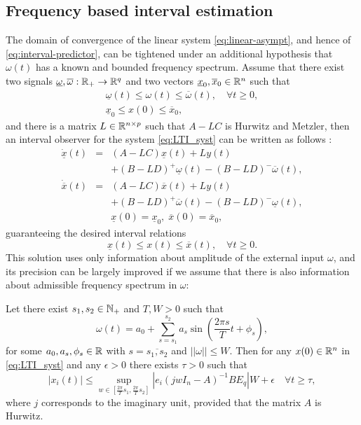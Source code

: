 \subsection{Frequency based interval estimation}
\label{sec:Frequency}
The domain of convergence of the linear system \eqref{eq:linear-asympt}, and hence of \eqref{eq:interval-predictor}, can be tightened under an additional hypothesis that $\omega(t)$ has a known and bounded frequency spectrum.
Assume that there exist two signals $\underline{\omega},\overline{\omega}:\mathbb{R}_{+}\to\mathbb{R}^{q}$ and two vectors $\underline{x}_{0},\overline{x}_{0}\in\mathbb{R}^{n}$ such that
\begin{gather*}
\underline{\omega}(t)\leq\omega(t)\leq\overline{\omega}(t),\quad\forall t\geq0,\\
\underline{x}_{0}\leq x(0)\leq\overline{x}_{0},
\end{gather*} and there is a matrix $L\in\mathbb{R}^{n\times p}$ such that $A-LC$ is Hurwitz and Metzler, then an interval observer for the system \eqref{eq:LTI_syst} can be written as follows \citep{REZ11}:
\begin{eqnarray}
\dot{\underline{x}}(t) & = & (A-LC)\underline{x}(t)+Ly(t)\nonumber \\
&  & +(B-LD)^{+}\underline{\omega}(t)-(B-LD)^{-}\overline{\omega}(t),\nonumber \\
\dot{\overline{x}}(t) & = & (A-LC)\overline{x}(t)+Ly(t)\label{eq:IO_LTI}\\
&  & +(B-LD)^{+}\overline{\omega}(t)-(B-LD)^{-}\underline{\omega}(t),\nonumber \\
&  & \underline{x}(0)=\underline{x}_{0},\;\overline{x}(0)=\overline{x}_{0},\nonumber 
\end{eqnarray}
guaranteeing the desired interval relations
\[
\underline{x}(t)\leq x(t)\leq\overline{x}(t),\quad\forall t\geq0.
\]
This solution uses only information about amplitude of the external input $\omega$, and its precision can be largely improved if we assume that there is also information about admissible frequency spectrum in $\omega$:
\begin{lemma}
	\label{lem:IntFreq}
	\begin{leftbar}[lemmabar]
	Let there exist $s_{1},s_{2}\in\mathbb{N}_{+}$ and $T,W>0$
	such that
	\[
	\omega(t)=a_{0}+\sum_{s=s_{1}}^{s_{2}}a_{s}\sin\left(\frac{2\pi s}{T}t+\phi_{s}\right),
	\]
	for some $a_{0},a_{s},\phi_{s}\in\mathbb{R}$ with $s=\overline{s_{1},s_{2}}$ and $||\omega||\leq W$. Then for any $x(0)\in\mathbb{R}^{n}$ in \eqref{eq:LTI_syst} and any $\epsilon>0$ there exists $\tau>0$ such that
	\[
	|x_{i}(t)|\leq\sup_{w\in[\frac{2\pi}{T}s_{1},\frac{2\pi}{T}s_{2}]}|e_{i}(jwI_{n}-A)^{-1}BE_{q}|W+\epsilon\quad\forall t\geq\tau,
	\]
	where $j$ corresponds to the imaginary unit, provided that the matrix $A$ is Hurwitz.
	\end{leftbar}
\end{lemma}
